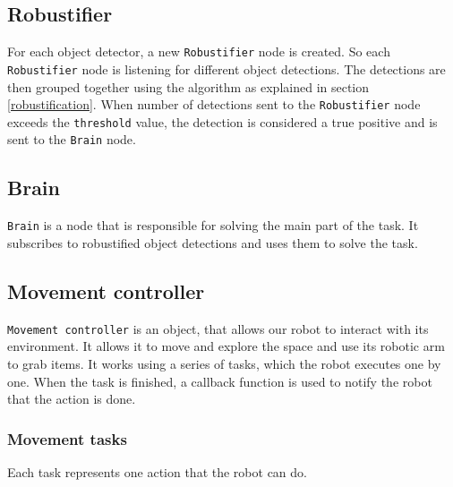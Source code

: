 \documentclass[12pt,a4paper]{article}
\begin{document}
	\subsection{Robustifier}
	For each object detector, a new \texttt{Robustifier} node is created. So each \texttt{Robustifier} node is listening for different object detections. The detections are then grouped together using the algorithm as explained in section \ref{robustification}. When number of detections sent to the \texttt{Robustifier} node exceeds the \texttt{threshold} value, the detection is considered a true positive and is sent to the \texttt{Brain} node. \\
	
	\subsection{Brain}
	\texttt{Brain} is a node that is responsible for solving the main part of the task. It subscribes to robustified object detections and uses them to solve the task. \\
	
	
	\subsection{Movement controller}
	\texttt{Movement controller} is an object, that allows our robot to interact with its environment. It allows it to move and explore the space and use its robotic arm to grab items. It works using a series of tasks, which the robot executes one by one. When the task is finished, a callback function is used to notify the robot that the action is done. \\

	\subsubsection{Movement tasks}
	Each task represents one action that the robot can do.
\end{document}
